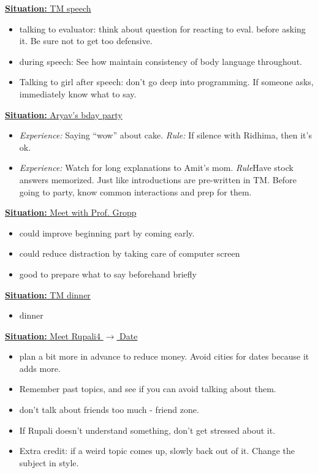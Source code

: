 \documentclass[11pt]{article}
\newcommand{\newSituation}[1]{\underline{\textbf{Situation:} #1} }
\begin{document}
\newSituation{TM speech} 
\begin{itemize} 
\item talking to evaluator: think about question for reacting to eval. before asking it. Be sure not to get too defensive. 
\item during speech: See how maintain consistency of body language throughout. 
\item Talking to girl after speech: don't go deep into programming. If someone asks, immediately know what to say. 
\end{itemize} 

\newSituation{ Aryav's bday party  } 
\begin{itemize} 
\item \textit{Experience:} Saying ``wow'' about cake. \textit{Rule:} If silence with Ridhima, then it's ok. 
\item \textit{Experience:} Watch for long explanations to Amit's mom. \textit{Rule}Have stock answers memorized. Just like introductions are pre-written in TM.  Before going to party, know common interactions and prep for them. 
\end{itemize} 

\newSituation{Meet with Prof. Gropp}
\begin{itemize} 
\item could improve beginning part by coming early. 
\item could reduce distraction by taking care of computer screen 
\item good to prepare what to say beforehand briefly
\end{itemize} 

\newSituation{TM dinner} 
\begin{itemize} 
\item dinner 
\end{itemize} 

\newSituation{Meet Rupali4  $\rightarrow$ Date} 
\begin{itemize}
\item plan a bit more in advance to reduce money. Avoid cities for dates because it adds more. 
\item Remember past topics, and see if you can avoid talking about them. 
\item don't talk about friends too much - friend zone. 
\item If Rupali doesn't understand something, don't get stressed about it. 
\item Extra credit: if a weird topic comes up, slowly back out of it. Change the subject in style. 
\end{itemize}
\end{document}
